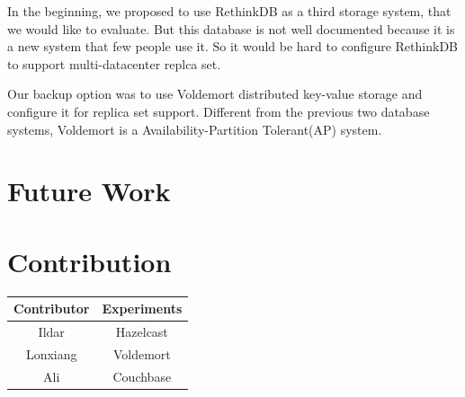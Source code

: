 \documentclass[a4paper]{article}
\begin{document}
In the beginning, we proposed to use RethinkDB as a third storage system, that we would like to evaluate. But this database is not well documented because it is a new system that few people use it. So it would be hard to configure RethinkDB to support multi-datacenter replca set.

Our backup option was to use Voldemort distributed key-value storage and configure it for replica set support. Different from the previous two database systems, Voldemort is a Availability-Partition Tolerant(AP) system. 


\section{Future Work}

\section*{Contribution}

\begin{table}[hb]
	\centering
	\begin{tabular}{|c|c|}
		\hline
		\rowcolor{light-gray} \textbf{Contributor} & \textbf{Experiments} \\ \hline
		Ildar & Hazelcast  \\ \hline
		Lonxiang & Voldemort  \\ \hline
		Ali & Couchbase  \\ \hline
	\end{tabular}
\end{table}
\end{document}
